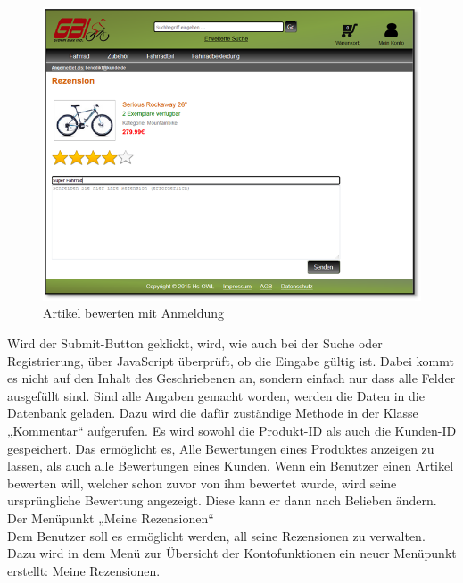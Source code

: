 \begin{figure}[H]
\begin{center}
\includegraphics[width=12cm]{Bilder/Michael_Abbildung12-ArtikelBewertenMitAnmeldung.png}
\end{center}
\caption{Artikel bewerten mit Anmeldung}
\end{figure}

\newpage
Wird der Submit-Button geklickt, wird, wie auch bei der Suche oder Registrierung, über JavaScript überprüft, ob die Eingabe gültig ist. Dabei kommt es nicht auf den Inhalt des Geschriebenen an, sondern einfach nur dass alle Felder ausgefüllt sind. Sind alle Angaben gemacht worden, werden die Daten in die Datenbank geladen. Dazu wird die dafür zuständige Methode in der Klasse „Kommentar“ aufgerufen. Es wird sowohl die Produkt-ID als auch die Kunden-ID gespeichert. Das ermöglicht es, Alle Bewertungen eines Produktes anzeigen zu lassen, als auch alle Bewertungen eines Kunden. Wenn ein Benutzer einen  Artikel bewerten will, welcher schon zuvor von ihm bewertet wurde, wird seine ursprüngliche Bewertung angezeigt. Diese kann er dann nach Belieben ändern.
\\
Der Menüpunkt „Meine Rezensionen“
\\
Dem Benutzer soll es ermöglicht werden, all seine Rezensionen zu verwalten. Dazu wird in dem Menü zur Übersicht der Kontofunktionen ein neuer Menüpunkt erstellt: Meine Rezensionen. 


